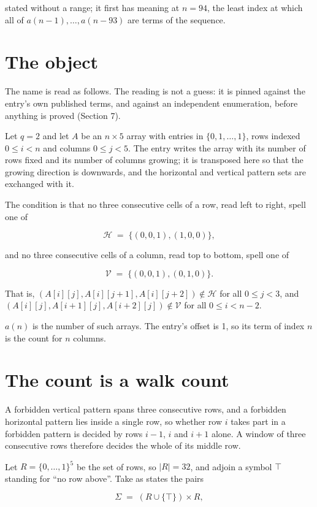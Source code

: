 \documentclass[11pt]{article}
\theoremstyle{definition}
\begin{document}
stated without a range; it first has meaning at $n = 94$, the least index at which all of $a(n-1),\dots,a(n-93)$ are terms of the sequence.

\section{The object}

The name is read as follows. The reading is not a guess: it is pinned against the entry's own published terms, and against an independent enumeration, before anything is proved (Section 7).

Let $q = 2$ and let $A$ be an $n \times 5$ array with entries in $\{0,1,\dots,1\}$, rows indexed $0 \le i < n$ and columns $0 \le j < 5$. The entry writes the array with its number of rows fixed and its number of columns growing; it is transposed here so that the growing direction is downwards, and the horizontal and vertical pattern sets are exchanged with it.

The condition is that no three consecutive cells of a row, read left to right, spell one of

\[\mathcal{H} \;=\; \{(0,0,1), (1,0,0)\},\]

and no three consecutive cells of a column, read top to bottom, spell one of

\[\mathcal{V} \;=\; \{(0,0,1), (0,1,0)\}.\]

That is, $(A[i][j],A[i][j{+}1],A[i][j{+}2]) \notin \mathcal{H}$ for all $0 \le j < 3$, and $(A[i][j],A[i{+}1][j],A[i{+}2][j]) \notin \mathcal{V}$ for all $0 \le i < n-2$.

$a(n)$ is the number of such arrays. The entry's offset is 1, so its term of index $n$ is the count for $n$ columns.

\section{The count is a walk count}

A forbidden vertical pattern spans three consecutive rows, and a forbidden horizontal pattern lies inside a single row, so whether row $i$ takes part in a forbidden pattern is decided by rows $i-1$, $i$ and $i+1$ alone. A window of three consecutive rows therefore decides the whole of its middle row.

Let $R = \{0,\dots,1\}^{5}$ be the set of rows, so $|R| = 32$, and adjoin a symbol $\top$ standing for ``no row above''. Take as states the pairs

\[\Sigma \;=\; (R \cup \{\top\}) \times R,\]
\end{document}
